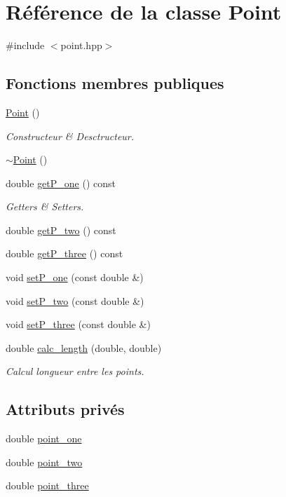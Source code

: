 \hypertarget{class_point}{\section{Référence de la classe Point}
\label{class_point}
}


{\ttfamily \#include $<$point.\-hpp$>$}

\subsection*{Fonctions membres publiques}
\begin{DoxyCompactItemize}
\item 
\hyperlink{class_point_ad92f2337b839a94ce97dcdb439b4325a}{Point} ()
\begin{DoxyCompactList}\small\item\em Constructeur \& Desctructeur. \end{DoxyCompactList}\item 
\hyperlink{class_point_a395fa04b4ec126b66fc053f829a30cc1}{$\sim$\-Point} ()
\item 
double \hyperlink{class_point_a211f8dee098122a2f1c326ba42652ee2}{get\-P\-\_\-one} () const 
\begin{DoxyCompactList}\small\item\em Getters \& Setters. \end{DoxyCompactList}\item 
double \hyperlink{class_point_afd9ee8dca2913903fd6a1a95d743afaa}{get\-P\-\_\-two} () const 
\item 
double \hyperlink{class_point_adf0f89d9beca24315b45d96786896a56}{get\-P\-\_\-three} () const 
\item 
void \hyperlink{class_point_aea96dfedc04450f20928929fc1357ba6}{set\-P\-\_\-one} (const double \&)
\item 
void \hyperlink{class_point_a282784b2c6669e5270b9ec447f6e9dc1}{set\-P\-\_\-two} (const double \&)
\item 
void \hyperlink{class_point_aa46638c8c613fa6192272d4a4168f503}{set\-P\-\_\-three} (const double \&)
\item 
double \hyperlink{class_point_a5cb059b4e16aca7ca375076971d90521}{calc\-\_\-length} (double, double)
\begin{DoxyCompactList}\small\item\em Calcul longueur entre les points. \end{DoxyCompactList}\end{DoxyCompactItemize}
\subsection*{Attributs privés}
\begin{DoxyCompactItemize}
\item 
double \hyperlink{class_point_a030522c3949dc71bc4c1f39eb1b0c77e}{point\-\_\-one}
\item 
double \hyperlink{class_point_a7eece7f7413a741137cf32bb763f3987}{point\-\_\-two}
\item 
double \hyperlink{class_point_af7cb3c4c0c0f52218ac9ce180df003da}{point\-\_\-three}
\end{DoxyCompactItemize}


